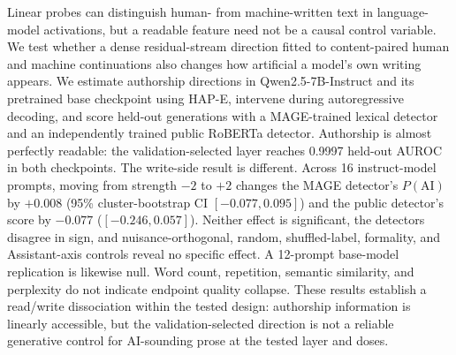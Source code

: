 Linear probes can distinguish human- from machine-written text in language-model activations, but a readable feature need not be a causal control variable. We test whether a dense residual-stream direction fitted to content-paired human and machine continuations also changes how artificial a model's own writing appears. We estimate authorship directions in Qwen2.5-7B-Instruct and its pretrained base checkpoint using HAP-E, intervene during autoregressive decoding, and score held-out generations with a MAGE-trained lexical detector and an independently trained public RoBERTa detector. Authorship is almost perfectly readable: the validation-selected layer reaches 0.9997 held-out AUROC in both checkpoints. The write-side result is different. Across 16 instruct-model prompts, moving from strength $-2$ to $+2$ changes the MAGE detector's $P(\mathrm{AI})$ by $+0.008$ (95\% cluster-bootstrap CI $[-0.077,0.095]$) and the public detector's score by $-0.077$ ($[-0.246,0.057]$). Neither effect is significant, the detectors disagree in sign, and nuisance-orthogonal, random, shuffled-label, formality, and Assistant-axis controls reveal no specific effect. A 12-prompt base-model replication is likewise null. Word count, repetition, semantic similarity, and perplexity do not indicate endpoint quality collapse. These results establish a read/write dissociation within the tested design: authorship information is linearly accessible, but the validation-selected direction is not a reliable generative control for AI-sounding prose at the tested layer and doses.

